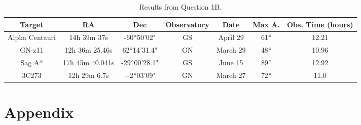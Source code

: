 \documentclass{article}
\begin{document}
        \begin{table}[h!]
        \centering
        \begin{tabular}{|c| c| c| c| c | c | c|} 
         \hline
         Target & RA & Dec & Observatory & Date & Max A. & Obs. Time (hours) \\
         \hline
         \hline
         Alpha Centauri & 14h 39m 37s & -60$\degree$50'02" & GS & April 29 & 61$\degree$ & 12.21 \\
         \hline
         GN-z11 & 12h 36m 25.46s & 62$\degree$14'31.4" & GN & March 29 & 48$\degree$ & 10.96 \\
         \hline
         Sag A* & 17h 45m 40.041s & -29$\degree$00'28.1" & GS & June 15 & 89$\degree$ & 12.92 \\
         \hline
         3C273 & 12h 29m 6.7s & +2$\degree$03'09" & GN & March 27 & 72$\degree$ & 11.0 \\
         \hline
        \end{tabular}
        \caption{Results from Question 1B.}
        \label{table:1}
        \end{table}
        
        
        
            
        
        
\section*{Appendix}
\end{document}
